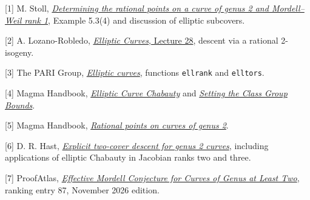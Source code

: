 \documentclass[12pt]{article}
\newcommand{\sub}[1]{\par\smallskip{\bfseries\color{green}#1}\par}
\begin{document}
\sub{References}
{\small
[1] M. Stoll, \href{https://mathe2.uni-bayreuth.de/stoll/papers/rank1.pdf}{\emph{Determining the rational points on a curve of genus 2 and Mordell--Weil rank 1}}, Example 5.3(4) and discussion of elliptic subcovers.

[2] A. Lozano-Robledo, \href{https://alozano.clas.uconn.edu/wp-content/uploads/sites/490/2021/04/MATH-5020-Elliptic-Curves-Lecture-28.pdf}{\emph{Elliptic Curves}, Lecture 28}, descent via a rational 2-isogeny.

[3] The PARI Group, \href{https://pari.math.u-bordeaux.fr/dochtml/html/Elliptic_curves.html}{\emph{Elliptic curves}}, functions \texttt{ellrank} and \texttt{elltors}.

[4] Magma Handbook, \href{https://magma.maths.usyd.edu.au/magma/handbook/text/1568}{\emph{Elliptic Curve Chabauty}} and \href{https://magma.maths.usyd.edu.au/magma/handbook/text/416}{\emph{Setting the Class Group Bounds}}.

[5] Magma Handbook, \href{https://magma.maths.usyd.edu.au/magma/handbook/text/1613}{\emph{Rational points on curves of genus 2}}.

[6] D. R. Hast, \href{https://people.maths.bris.ac.uk/~jb12407/ANTS-XV/papers/ANTS-XV_hast.pdf}{\emph{Explicit two-cover descent for genus 2 curves}}, including applications of elliptic Chabauty in Jacobian ranks two and three.

[7] ProofAtlas, \href{https://www.proofatlas.ai/open-problems/}{\emph{Effective Mordell Conjecture for Curves of Genus at Least Two}}, ranking entry 87, November 2026 edition.}
\end{document}
